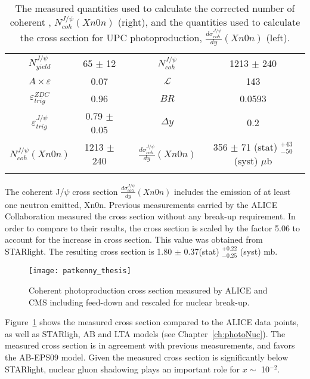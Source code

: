     \begin{table}
      \centering
      \begin{tabular}{|c|c|c|c|c|} \hhline{--~--} 
        $N^{J/\psi}_{yield}$ & 65 $\pm$ 12 & & $N^{J/\psi}_{coh}$  & 1213 $\pm$ 240 \\ \hhline{--~--}  
        $A\times \varepsilon$ & 0.07 & & $\mathcal{L}$ & 143 \\ \hhline{--~--}
        $\varepsilon^{ZDC}_{trig}$ & 0.96 & & $BR$ & 0.0593 \\ \hhline{--~--}
        $\varepsilon^{J/\psi}_{trig}$ & 0.79 $\pm$ 0.05 & & $\Delta y$ & 0.2 \\ \hhline{--~--} \hhline{--~--}
        $N^{J/\psi{}}_{coh} (Xn0n)$ & 1213 $\pm$ 240 & & $\frac{d\sigma^{J/\psi}_{coh}}{dy} (Xn0n)$ & 356 $\pm$ 71 (stat) $^{+43}_{-50}$ (syst) $\mu$b \\  \hhline{--~--}
      \end{tabular}
      \caption{\label{tab:nJpCoh}The measured quantities used to calculate the 
        corrected number of coherent \JPsi{}, $N^{J/\psi}_{coh} (Xn0n)$ (right),
        and the quantities used to calculate the cross section for UPC \JPsi{} 
        photoproduction, $\frac{d\sigma^{J/\psi}_{coh}}{dy} (Xn0n)$ (left).}
    \end{table}  
    
    The coherent J/$\psi$ cross section 
      $\frac{d\sigma^{J/\psi}_{coh}}{dy} (Xn0n)$ includes the emission of at 
      least one neutron emitted, Xn0n. 
    Previous measurements carried by the ALICE Collaboration measured the cross
      section without any break-up requirement. 
    In order to compare to their results, the cross section is scaled by the 
      factor 5.06 to account for the increase in cross section. 
    This value was obtained from STARlight. 
    The resulting cross section is 1.80 $\pm$ 0.37(stat) $^{+0.22}_{-0.25}$ (syst) mb.
 
    \begin{figure}[!Hhbt]
      \centering
      \texttt{[image: patkenny\_thesis]}
      \caption{Coherent \JPsi{} photoproduction cross section measured by ALICE 
        and CMS including feed-down and rescaled for nuclear break-up.}
      \label{fig:coJpXsec}
    \end{figure}
    Figure~\ref{fig:coJpXsec} shows the measured cross section compared to the 
      ALICE data points, as well as STARligh, AB and LTA models 
      (see Chapter~\ref{ch:photoNuc}). 
    The measured cross section is in agreement with previous measurements, and 
      favors the AB-EPS09 model. 
    Given the measured cross section is significantly below STARlight, nuclear 
      gluon shadowing plays an important role for $x\sim$ 10$^{-2}$. 


